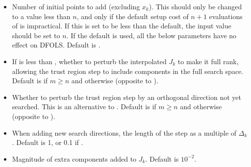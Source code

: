 \documentclass[letterpaper,10pt,english]{sphinxmanual}
\begin{document}
\label{\detokenize{advanced:dynamically-growing-initial-set}}\begin{itemize}
\item {} 
\sphinxAtStartPar
{} \sphinxhyphen{} Number of initial points to add (excluding \(x_k\)). This should only be changed to a value less than \(n\), and only if the default setup cost of \(n+1\) evaluations of  is impractical. If this is set to be less than the default, the input value  should be set to \(n\). If the default is used, all the below parameters have no effect on DFO\sphinxhyphen{}LS. Default is .

\item {} 
\sphinxAtStartPar
{} \sphinxhyphen{} If  is less than , whether to perturb the interpolated \(J_k\) to make it full rank, allowing the trust region step to include components in the full search space. Default is  if \(m\geq n\) and  otherwise (opposite to ).

\item {} 
\sphinxAtStartPar
{} \sphinxhyphen{} Whether to perturb the trust region step by an orthogonal direction not yet searched. This is an alternative to . Default is  if \(m\geq n\) and  otherwise (opposite to ).

\item {} 
\sphinxAtStartPar
{} \sphinxhyphen{} When adding new search directions, the length of the step as a multiple of \(\Delta_k\). Default is 1, or 0.1 if .

\item {} 
\sphinxAtStartPar
{} \sphinxhyphen{} Magnitude of extra components added to \(J_k\). Default is \(10^{-2}\).


\end{itemize}
\end{document}

